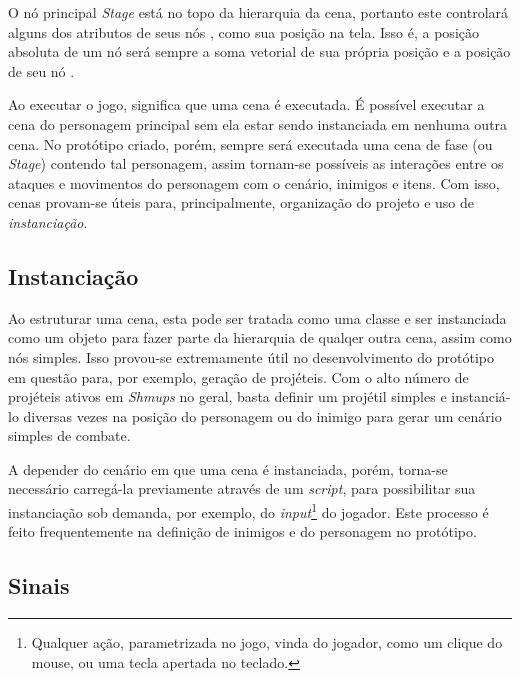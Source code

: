 O nó principal \textit{Stage} está no topo da hierarquia da cena, portanto este controlará alguns dos atributos de seus nós \textquotedbl{}, como sua posição na tela. Isso é, a posição absoluta de um nó será sempre a soma vetorial de sua própria posição e a posição de seu nó \textquotedbl{}.

Ao executar o jogo, significa que uma cena é executada. É possível executar a cena do personagem principal sem ela estar sendo instanciada em nenhuma outra cena. No protótipo criado, porém, sempre será executada uma cena de fase (ou \textit{Stage}) contendo tal personagem, assim tornam-se possíveis as interações entre os ataques e movimentos do personagem com o cenário, inimigos e itens. Com isso, cenas provam-se úteis para, principalmente, organização do projeto e uso de \textit{instanciação}.

\subsection{Instanciação}

Ao estruturar uma cena, esta pode ser tratada como uma classe e ser instanciada como um objeto para fazer parte da hierarquia de qualqer outra cena, assim como nós simples. Isso provou-se extremamente útil no desenvolvimento do protótipo em questão para, por exemplo, geração de projéteis. Com o alto número de projéteis ativos em \textit{Shmups} no geral, basta definir um projétil simples e instanciá-lo diversas vezes na posição do personagem ou do inimigo para gerar um cenário simples de combate.

A depender do cenário em que uma cena é instanciada, porém, torna-se necessário carregá-la previamente através de um \textit{script}, para possibilitar sua instanciação sob demanda, por exemplo, do \textit{input}\footnote{
    Qualquer ação, parametrizada no jogo, vinda do jogador, como um clique do mouse, ou uma tecla apertada no teclado.
} do jogador. Este processo é feito frequentemente na definição de inimigos e do personagem no protótipo.

\subsection{Sinais}

